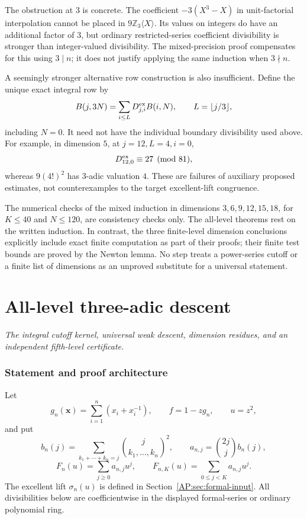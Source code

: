 \documentclass[11pt,a4paper]{article}
\theoremstyle{definition}\newtheorem{definition}[theorem]{Definition}
\theoremstyle{remark}\newtheorem{remark}[theorem]{Remark}
\numberwithin{equation}{section}
\newcommand{\partstart}[3]{\clearpage\part{#1}\label{#2}\noindent\textit{#3}\par\medskip}
\begin{document}
The obstruction at $3$ is concrete. The coefficient
$-3(X^3-X)$ in unit-factorial interpolation cannot be placed in
$9\mathbb Z_3\langle X\rangle$. Its values on integers do have an
additional factor of $3$, but ordinary restricted-series coefficient
divisibility is stronger than integer-valued divisibility. The
mixed-precision proof compensates for this using $3\mid n$; it does
not justify applying the same induction when $3\nmid n$.

A seemingly stronger alternative row construction is also insufficient.
Define the unique exact integral row by
\[
 B(j,3N)=\sum_{i\le L}D^{\rm ex}_{j,i}B(i,N),\qquad L=\lfloor j/3\rfloor,
\]
including $N=0$. It need not have the individual boundary divisibility
used above. For example, in dimension $5$, at $j=12,L=4,i=0$,
\[
 D^{\rm ex}_{12,0}\equiv27\pmod{81},
\]
whereas $9(4!)^2$ has $3$-adic valuation $4$. These are failures of
auxiliary proposed estimates, not counterexamples to the target
excellent-lift congruence.

The numerical checks of the mixed induction in dimensions
$3,6,9,12,15,18$, for $K\le40$ and $N\le120$, are consistency checks
only. The all-level theorems rest on the written induction. In contrast,
the three finite-level dimension conclusions explicitly include exact finite
computation as part of their proofs; their finite test bounds are
proved by the Newton lemma. No step treats a power-series cutoff or a
finite list of dimensions as an unproved substitute for a universal
statement.




\partstart{All-level three-adic descent}{part:octa-three}{The integral cutoff kernel, universal weak descent, dimension residues, and an independent fifth-level certificate.}
\section{Statement and proof architecture}\label{AP:source-main-1}\label{AP:sec:scope}
Let
\[
 g_n(\mathbf x)=\sum_{i=1}^n(x_i+x_i^{-1}),\qquad
 f=1-zg_n,\qquad u=z^2,
\]
and put
\[
 b_n(j)=\sum_{k_1+\cdots+k_n=j}
             \binom{j}{k_1,\ldots,k_n}^{\!2},\qquad
 a_{n,j}=\binom{2j}{j}b_n(j),
\]
\[
 F_n(u)=\sum_{j\ge0}a_{n,j}u^j,\qquad
 F_{n,K}(u)=\sum_{0\le j<K}a_{n,j}u^j.
\]
The excellent lift $\sigma_n(u)$ is defined in
Section~\ref{AP:sec:formal-input}.  All divisibilities below are
coefficientwise in the displayed formal-series or ordinary polynomial
ring.
\end{document}
